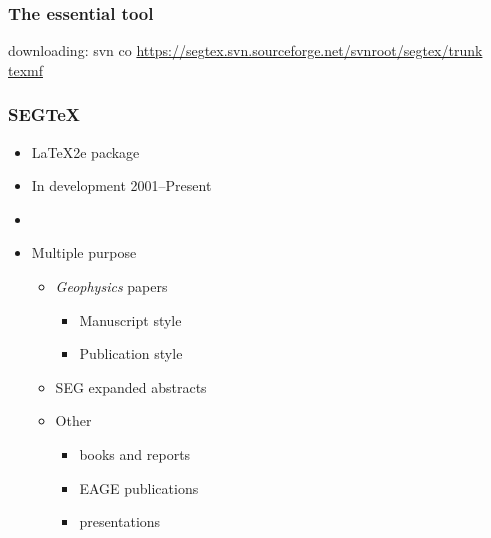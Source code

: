 \begin{frame} 

\frametitle{The essential tool}

downloading: svn co \url{https://segtex.svn.sourceforge.net/svnroot/segtex/trunk texmf}

\end{frame}
\cwpnote{}


\begin{frame}
  \frametitle{SEGTeX}
  \begin{itemize}
  \item {\LaTeX2e} package
  \item In development 2001--Present
  \item {}
  \item Multiple purpose
    \begin{itemize}
    \item \emph{Geophysics} papers
    \begin{itemize}
    \item Manuscript style
    \item Publication style 
    \end{itemize}
    \item SEG expanded abstracts
    \item Other
    \begin{itemize}
    \item books and reports
    \item EAGE publications
    \item presentations
     \end{itemize}
    \end{itemize}
   \end{itemize}
\end{frame}

